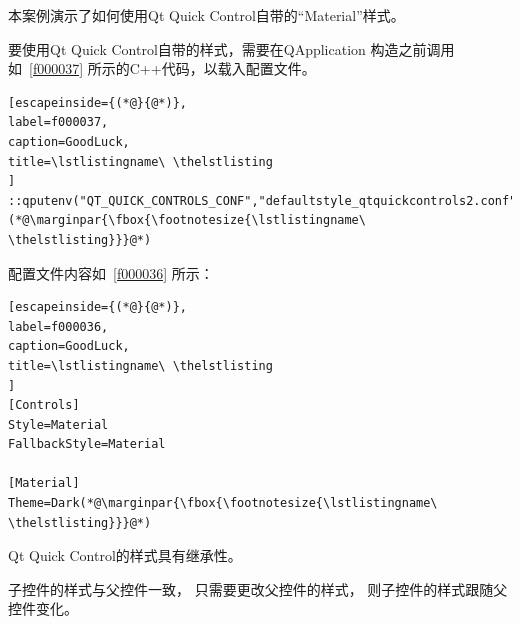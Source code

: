 本案例演示了如何使用Qt Quick Control自带的“Material”样式。

要使用Qt Quick Control自带的样式，需要在QApplication
构造之前调用如\lstlistingname\ \ref{f000037}
所示的C{\sourcefonttwo{}+}{\sourcefonttwo{}+}代码，以载入配置文件。

\FloatBarrier
\begin{lstlisting}[escapeinside={(*@}{@*)},
label=f000037,
caption=GoodLuck,
title=\lstlistingname\ \thelstlisting
]
::qputenv("QT_QUICK_CONTROLS_CONF","defaultstyle_qtquickcontrols2.conf");(*@\marginpar{\fbox{\footnotesize{\lstlistingname\ \thelstlisting}}}@*)\end{lstlisting}          %


配置文件内容如\lstlistingname\ \ref{f000036}
所示：
\FloatBarrier
\begin{lstlisting}[escapeinside={(*@}{@*)},
label=f000036,
caption=GoodLuck,
title=\lstlistingname\ \thelstlisting
]
[Controls]
Style=Material
FallbackStyle=Material

[Material]
Theme=Dark(*@\marginpar{\fbox{\footnotesize{\lstlistingname\ \thelstlisting}}}@*)\end{lstlisting}          %

Qt Quick Control的样式具有继承性。

子控件的样式与父控件一致，
只需要更改父控件的样式，
则子控件的样式跟随父控件变化。
















